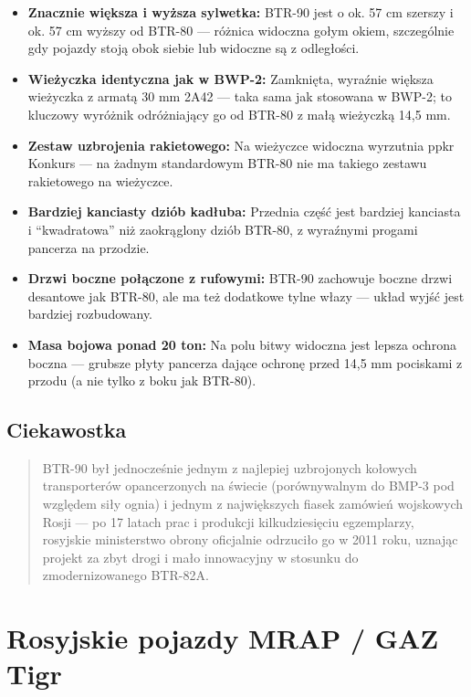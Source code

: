 \documentclass[12pt,oneside]{book}
\providecommand{\tightlist}{%
  \setlength{\itemsep}{0pt}\setlength{\parskip}{0pt}}
\begin{document}
\begin{itemize}
\tightlist
\item
  \textbf{Znacznie większa i wyższa sylwetka:} BTR-90 jest o ok. 57 cm
  szerszy i ok. 57 cm wyższy od BTR-80 --- różnica widoczna gołym okiem,
  szczególnie gdy pojazdy stoją obok siebie lub widoczne są z
  odległości.
\item
  \textbf{Wieżyczka identyczna jak w BWP-2:} Zamknięta, wyraźnie większa
  wieżyczka z armatą 30 mm 2A42 --- taka sama jak stosowana w BWP-2; to
  kluczowy wyróżnik odróżniający go od BTR-80 z małą wieżyczką 14,5 mm.
\item
  \textbf{Zestaw uzbrojenia rakietowego:} Na wieżyczce widoczna
  wyrzutnia ppkr Konkurs --- na żadnym standardowym BTR-80 nie ma
  takiego zestawu rakietowego na wieżyczce.
\item
  \textbf{Bardziej kanciasty dziób kadłuba:} Przednia część jest
  bardziej kanciasta i ``kwadratowa'' niż zaokrąglony dziób BTR-80, z
  wyraźnymi progami pancerza na przodzie.
\item
  \textbf{Drzwi boczne połączone z rufowymi:} BTR-90 zachowuje boczne
  drzwi desantowe jak BTR-80, ale ma też dodatkowe tylne włazy --- układ
  wyjść jest bardziej rozbudowany.
\item
  \textbf{Masa bojowa ponad 20 ton:} Na polu bitwy widoczna jest lepsza
  ochrona boczna --- grubsze płyty pancerza dające ochronę przed 14,5 mm
  pociskami z przodu (a nie tylko z boku jak BTR-80).
\end{itemize}

\subsection{Ciekawostka}\label{ciekawostka-16}

\begin{quote}
BTR-90 był jednocześnie jednym z najlepiej uzbrojonych kołowych
transporterów opancerzonych na świecie (porównywalnym do BMP-3 pod
względem siły ognia) i jednym z największych fiasek zamówień wojskowych
Rosji --- po 17 latach prac i produkcji kilkudziesięciu egzemplarzy,
rosyjskie ministerstwo obrony oficjalnie odrzuciło go w 2011 roku,
uznając projekt za zbyt drogi i mało innowacyjny w stosunku do
zmodernizowanego BTR-82A.
\end{quote}

\section{Rosyjskie pojazdy MRAP / GAZ
Tigr}\label{rosyjskie-pojazdy-mrap-gaz-tigr}
\end{document}
